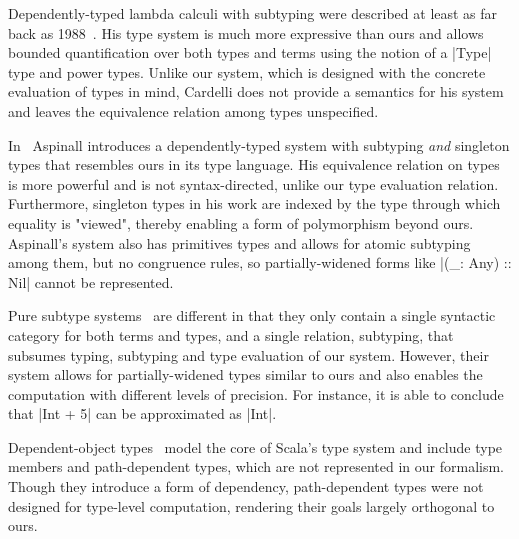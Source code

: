 Dependently-typed lambda calculi with subtyping were described at least as far back as 1988~\citep{cardelli1988structural}.
His type system is much more expressive than ours and allows bounded quantification over both types and terms using the notion of a |Type| type and power types.
Unlike our system, which is designed with the concrete evaluation of types in mind, Cardelli does not provide a semantics for his system and leaves the equivalence relation among types unspecified.

In~\citep{aspinall1994subtyping} Aspinall introduces a dependently-typed system with subtyping \emph{and} singleton types that resembles ours in its type language.
His equivalence relation on types is more powerful and is not syntax-directed, unlike our type evaluation relation.
Furthermore, singleton types in his work are indexed by the type through which equality is "viewed", thereby enabling a form of polymorphism beyond ours.
Aspinall's system also has primitives types and allows for atomic subtyping among them, but no congruence rules, so partially-widened forms like |(_: Any) :: Nil| cannot be represented.

Pure subtype systems~\citep{hutchins2010pure} are different in that they only contain a single syntactic category for both terms and types, and a single relation, subtyping, that subsumes typing, subtyping and type evaluation of our system.
However, their system allows for partially-widened types similar to ours and also enables the computation with different levels of precision.
For instance, it is able to conclude that |Int + 5| can be approximated as |Int|.

Dependent-object types~\citep{amin2017type} model the core of Scala's type system and include type members and path-dependent types, which are not represented in our formalism.
Though they introduce a form of dependency, path-dependent types were not designed for type-level computation, rendering their goals largely orthogonal to ours.
